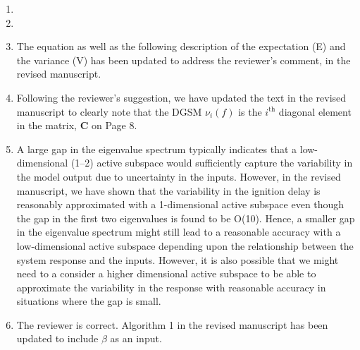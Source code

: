 \documentclass[11pt,final]{article}
\newcommand{\referee}[1]{\vspace{.1ex}\noindent{\textcolor{blue}{#1}}}
\begin{document}
\begin{enumerate}[wide, labelwidth=!, labelindent=0pt]
\item \referee{7.23-27: why 'statistical independence' and not just 'independence'? Is there any other 
type of independence?}

\item \referee{7.29-30: Any PDF can be written in a Boltzmann form, V(x) is just the negative log-PDF, 
I am not sure if it is necessary to bring up a Boltzmann distribution language here.
Also, it could be confused with Maxwell-Boltzmann distribution, which is a very specific PDF form.}


\item \referee{7.40: Explain what E and V are with respect to in Eq (8).}

\noindent  The equation as well as the following description of the expectation (E) and the variance (V)
has been updated to address the reviewer's comment, in the revised manuscript. 

\item \referee{7.50: Just say in words that it is the i-th diagonal element of matrix C.}

\noindent Following the reviewer's suggestion, we have updated the text in the revised manuscript to
clearly note that the DGSM $\nu_i(f)$ is the $i^{\text{th}}$ diagonal element in the matrix, $\mathbf{C}$
on Page 8.

\item \referee{10.56: what if there is no eigenvalue gap of O(100)?}

\noindent A large gap in the eigenvalue spectrum typically indicates that a low-dimensional (1--2) active subspace 
would sufficiently capture the variability in the model output due to uncertainty in the inputs. However,
in the revised manuscript, we have shown that the variability in the ignition delay is reasonably
approximated with a 1-dimensional active subspace even though the gap in the first two eigenvalues
is found to be O(10). Hence, a smaller gap in the eigenvalue spectrum might still lead to a reasonable
accuracy with a low-dimensional active subspace depending upon the relationship between the
system response and the inputs. However, it is also possible that we might need to a consider a higher 
dimensional active subspace to be able to approximate the variability in the response with reasonable
accuracy in situations where the gap is small. 

\item \referee{11.33: Alg. 1: should have \beta as input, too?}

\noindent The reviewer is correct. Algorithm 1 in the revised manuscript has been updated to include $\beta$
as an input. 

\noindent 

\end{enumerate}
\end{document}
